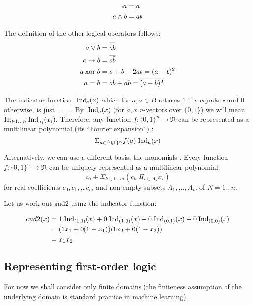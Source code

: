 \documentclass{article} %
\begin{document}
\begin{align*}
  \neg a &= \bar{a}\\
  a \wedge b &= a b
\end{align*}

The definition of the other logical operators follows:
  \begin{align*}
  a\vee b &= \overline{\bar{a}\bar{b}} \\
  a \rightarrow b &= \overline{a\bar{b}}\\
  a \;\mbox{xor}\; b &= a + b - 2ab=(a-b)^2\\
  a = b &=a b + \bar{a}\bar{b} =\overline{(a-b)^2}
  \end{align*}

The indicator function $\;\mbox{Ind}_a(x)$ which for $a,x \in B$ returns
$1$ if $a$ equals $x$ and $0$ otherwise, is just $\_=\_$. By
$\;\mbox{Ind}_a(x)$ (for $a,x$ $n$-vectors over $\{0, 1\}$) we will mean $\Pi_{i
  \in 1\ldots n} \;\mbox{Ind}_{a_i}(x_i)$.  Therefore, any function
$f:\{0,1\}^n \rightarrow \Re$ can be represented as a multilinear
polynomial (its ``Fourier expansion'') \cite{boolean-function}:
$$\Sigma_{a \in \{0,1\}^n} f(a)\;\mbox{Ind}_{a}(x)$$

Alternatively, we can use a different basis, the monomials \cite{PB-optimization}. Every
function $f:\{0,1\}^n \rightarrow \Re$ can be uniquely represented as a multilinear polynomial: 
$$ c_0 + \Sigma_{k \in 1\ldots m} (c_k\; \Pi_{i \in A_k} x_i)$$
\noindent for real coefficients $c_0, c_1, \ldots c_m$ and non-empty
subsets $A_1, \ldots, A_m$ of $N = 1 \ldots n$. 

Let us work out $\mbox{and2}$ using the indicator function:

\begin{align*}
and2(x)  &= 1 \;\mbox{Ind}_{(1,1)}(x) + 0\;\mbox{Ind}_{(1,0)}(x) + 0\;\mbox{Ind}_{(0,1)}(x) + 0\;\mbox{Ind}_{(0,0)}(x)\\
  &= (1  x_1+0(1-x_1))(1  x_2+0(1-x_2))\\
  &=x_1 x_2
\end{align*}

\subsection{Representing first-order logic}
For now we shall consider only finite domains (the finiteness assumption of the underlying domain is standard practice in machine learning).
\end{document}
